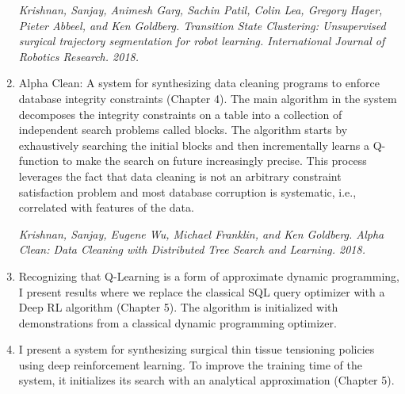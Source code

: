 \begin{enumerate}
    \emph{Krishnan, Sanjay, Animesh Garg, Sachin Patil, Colin Lea, Gregory Hager, Pieter Abbeel, and Ken Goldberg. Transition State Clustering: Unsupervised surgical trajectory segmentation for robot learning. International Journal of Robotics Research. 2018.}

    \item Alpha Clean: A system for synthesizing data cleaning programs to enforce database integrity constraints (Chapter 4). The main algorithm in the system decomposes the integrity constraints on a table into a collection of independent search problems called blocks. The algorithm starts by exhaustively searching the initial blocks and then incrementally learns a Q-function to make the search on future increasingly precise. This process leverages the fact that data cleaning is not an arbitrary constraint satisfaction problem and most database corruption is systematic, i.e., correlated with features of the data. 

     \emph{Krishnan, Sanjay, Eugene Wu, Michael Franklin, and Ken Goldberg. Alpha Clean: Data Cleaning with Distributed Tree Search and Learning. 2018.}

    \item Recognizing that Q-Learning is a form of approximate dynamic programming, I present results where we replace the classical SQL query optimizer with a Deep RL algorithm (Chapter 5). The algorithm is initialized with demonstrations from a classical dynamic programming optimizer.
    
    \item I present a system for synthesizing surgical thin tissue tensioning policies using deep reinforcement learning. To improve the training time of the system, it initializes its search with an analytical approximation (Chapter 5). 
    
    
    
\end{enumerate}




